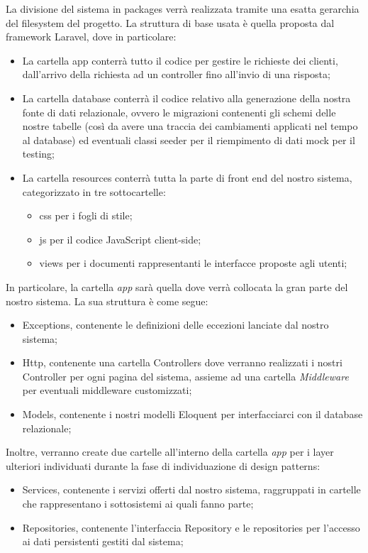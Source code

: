 La divisione del sistema in packages verrà realizzata tramite una esatta gerarchia del filesystem del progetto. La struttura di base usata è quella proposta dal framework Laravel, dove in particolare:
\begin{itemize}
	\item La cartella app conterrà tutto il codice per gestire le richieste dei clienti, dall’arrivo della richiesta ad un controller fino all’invio di una risposta;
	\item La cartella database conterrà il codice relativo alla generazione della nostra fonte di dati relazionale, ovvero le migrazioni contenenti gli schemi delle nostre tabelle (così da avere una traccia dei cambiamenti applicati nel tempo al database) ed eventuali classi seeder per il riempimento di dati mock per il testing;
	\item La cartella resources conterrà tutta la parte di front end del nostro sistema, categorizzato in tre sottocartelle:
	\begin{itemize}
		\item css per i fogli di stile;
		\item js per il codice JavaScript client-side;
		\item views per i documenti rappresentanti le interfacce proposte agli utenti;
		\end{itemize}
\end{itemize}

In particolare, la cartella \emph{app} sarà quella dove verrà collocata la gran parte del nostro sistema. La sua struttura è come segue:
\begin{itemize}
	\item Exceptions, contenente le definizioni delle eccezioni lanciate dal nostro sistema;
	\item Http, contenente una cartella Controllers dove verranno realizzati i nostri Controller per ogni pagina del sistema, assieme ad una cartella \emph{Middleware} per eventuali middleware customizzati;
	\item Models, contenente i nostri modelli Eloquent per interfacciarci con il database relazionale;
\end{itemize}

Inoltre, verranno create due cartelle all’interno della cartella \emph{app} per i layer ulteriori individuati durante la fase di individuazione di design patterns:
\begin{itemize}
	\item Services, contenente i servizi offerti dal nostro sistema, raggruppati in cartelle che rappresentano i sottosistemi ai quali fanno parte;
	\item Repositories, contenente l’interfaccia Repository e le repositories per l’accesso ai dati persistenti gestiti dal sistema;
\end{itemize}